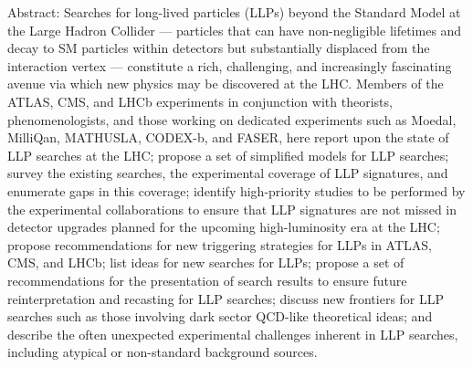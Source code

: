 Abstract: Searches for long-lived particles (LLPs) beyond the Standard Model at the Large Hadron Collider --- particles that can have non-negligible lifetimes and decay to SM particles within detectors but substantially displaced from the interaction vertex --- constitute a rich, challenging, and increasingly fascinating avenue via which new physics may be discovered at the LHC.  Members of the ATLAS, CMS, and LHCb experiments in conjunction with theorists, phenomenologists, and those working on dedicated experiments such as Moedal, MilliQan, MATHUSLA, CODEX-b, and FASER, here report upon the state of LLP searches at the LHC; propose a set of simplified models for LLP searches; survey the existing searches, the experimental coverage of LLP signatures, and enumerate gaps in this coverage; identify high-priority studies to be performed by the experimental collaborations to ensure that LLP signatures are not missed in detector upgrades planned for the upcoming high-luminosity era at the LHC; propose recommendations for new triggering strategies for LLPs in ATLAS, CMS, and LHCb; list ideas for new searches for LLPs; propose a set of recommendations for the presentation of search results to ensure future reinterpretation and recasting for LLP searches; discuss new frontiers for LLP searches such as those involving dark sector QCD-like theoretical ideas; and describe the often unexpected experimental challenges inherent in LLP searches, including atypical or non-standard background sources.
